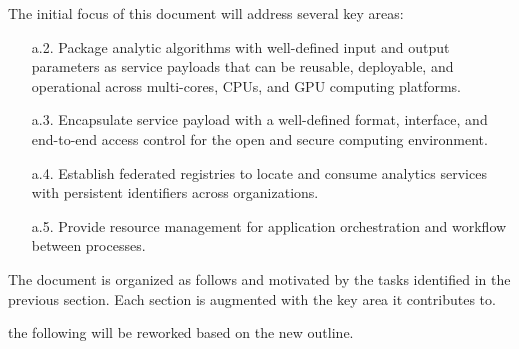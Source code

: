 The initial focus of this document will address several key areas:

\begin{enumerate}
  
   \item[a.2.] Package analytic algorithms with well-defined input and
     output parameters as service payloads that can be reusable,
     deployable, and operational across multi-cores, CPUs, and GPU
     computing platforms.

   \item[a.3.] Encapsulate service payload with a well-defined format,
     interface, and end-to-end access control for the open and secure
     computing environment.

   \item[a.4.] Establish federated registries to locate and consume
     analytics services with persistent identifiers across
     organizations.

   \item[a.5.] Provide resource management for application
     orchestration and workflow between processes.

\end{enumerate}





The document is organized as follows and motivated by the tasks
identified in the previous section. Each section is augmented with the
key area it contributes to.

 the following will be reworked based on the new outline.

